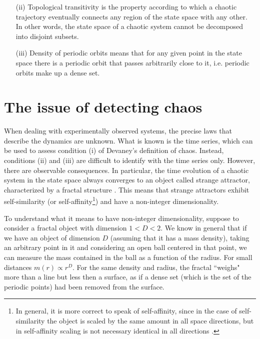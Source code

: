 \begin{itemize}
    \item[(ii)] Topological transitivity is the property according to which a chaotic trajectory eventually connects
    any region of the state space with any other. In other words, the state space of a chaotic system
    cannot be decomposed into disjoint subsets.

    \item[(iii)] Density of periodic orbits means that for any given point in the state space
    there is a periodic orbit that passes arbitrarily close to it, i.e. periodic orbits make up a dense set.

\end{itemize}


\section{The issue of detecting chaos}
\label{sec: chaos in experiments}

When dealing with experimentally observed systems, the precise laws that describe the dynamics are unknown.
What is known is the time series, which can be used to assess condition (i) of Devaney's definition
of chaos. Instead, conditions (ii) and (iii) are difficult to identify with the time series only.
However, there are observable consequences. In particular, the time
evolution of a chaotic system in the state space always converges to an object called strange
attractor, characterized by a fractal structure \cite{ref:fractal_dim,ref:fractal_book}. This means that strange
attractors exhibit self-similarity (or self-affinity\footnote{In general, it is more correct to speak
of self-affinity, since in the case of self-similarity the
object is scaled by the same amount in all space directions, but in self-affinity scaling is not
necessary identical in all directions \cite{ref:mandelbrot_fractal}.}) and have a non-integer dimensionality.

To understand what it means to have non-integer dimensionality, suppose
to consider a fractal object with dimension $1 < D < 2$.
We know in general that if we have an object of dimension $D$ (assuming that
it has a mass density), taking an arbitrary point in it and considering an open
ball centered in that point, we can measure the mass contained in the ball as
a function of the radius. For small distances $m(r)\propto r^D$. For the same density
and radius, the fractal ``weighs" more than a line but less then a surface, as if
a dense set (which is the set of the periodic points) had been removed from the
surface.

